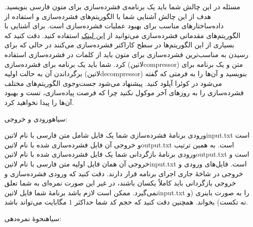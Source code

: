 ‌مسئله
در این چالش شما باید یک برنامه‌ی فشرده‌سازی برای متون فارسی بنویسید. هدف از این چالش آشنایی شما با الگوریتم‌های فشرده‌سازی و استفاده از داده‌ساختارهای مناسب برای بهبود عملیات فشرده‌سازی است. برای آشنایی با الگوریتم‌های مقدماتی فشرده‌سازی می‌توانید از 
\href{http://www.ijarcst.com/doc/vol2-issue3/ver.3/hardik_jani.pdf}{این لینک}
استفاده کنید. دقت کنید که بسیاری از این الگوریتم‌ها در سطح کاراکتر فشرده‌سازی می‌کنند در حالی که برای رسیدن به مناسب‌ترین فشرده‌سازی برای متون باید از کلمات در فشرده‌سازی استفاده کرد. شما باید یک برنامه برای فشرده‌سازی (‌لاتین{compressor}) متن و یک برنامه برای برگرداندن آن به حالت اولیه (‌لاتین{decompressor}) بنویسید و آن‌ها را به فرمتی که گفته می‌شود در کوئرا آپلود کنید. پیشنهاد می‌شود جست‌و‌جوی الگوریتم‌های مختلف فشرده‌سازی را به روزهای آخر موکول نکنید چرا که فرصت پیاده‌سازی، تست و بهبود آن‌ها را پیدا نخواهید کرد.

‌سیاه{ورودی و خروجی:}

ورودی برنامۀ فشرده‌سازی شما یک فایل شامل متن فارسی با نام ‌لاتین{input.txt} است و خروجی آن فایل فشرده‌سازی شده با نام ‌لاتین{output.txt} است. به همین ترتیب ورودی برنامۀ بازگردانی شما یک فایل فشرده‌سازی شده با نام ‌لاتین{output.txt} است و خروجی آن همان فایل اولیه متن فارسی با نام ‌لاتین{input.txt} است. فایل‌های ورودی و خروجی در شاخۀ جاری اجرای برنامه قرار دارند. دقت کنید که ورودی فشرده‌سازی و خروجی بازگردانی باید کاملاً یکسان باشند، در غیر این صورت نمره‌ای به شما تعلق نمی‌گیرد. ممکن است لازم باشد برنامۀ شما فایل ‌لاتین{input.txt} را به صورت باینری (و نه تکست) بخواند. همچنین دقت کنید که حجم کد شما حداکثر $1$ مگابایت می‌تواند باشد.

‌سیاه{نحوۀ نمره‌دهی:}

